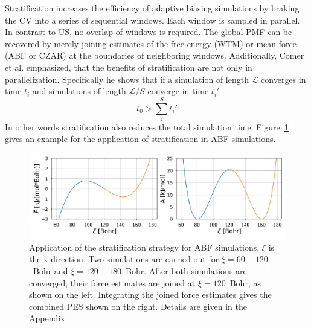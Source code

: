 Stratification increases the efficiency of adaptive biasing simulations by braking the CV into a series of sequential windows.\autocite{valleau1972monte} Each window is sampled in parallel.
In contrast to US, no overlap of windows is required.
The global PMF can be recovered by merely joining estimates of the free energy (WTM) or mean force (ABF or CZAR) at the boundaries of neighboring windows.
Additionally, Comer et al.\autocite{comer2015adaptive} emphasized, that the benefits of stratification are not only in parallelization.
Specifically he shows that if a simulation of length $\mathcal{L}$ converges in time $t_i$ and simulations of length $\mathcal{L}/S$ converge in time $t_i'$
\begin{equation}
  t_0 > \sum^S_i t_i'
\end{equation}
In other words stratification also reduces the total simulation time. Figure~\ref{fig:stratification} gives an example for the application of stratification in ABF simulations.
\begin{figure}[H]
    \centering
    \includegraphics[width=1\textwidth]{bilder/ABF_stratification}
    \caption{Application of the stratification strategy for ABF simulations. $\xi$ is the x-direction. Two simulations are carried out for $\xi=60-120$~Bohr and $\xi=120-180$~Bohr. After both simulations are converged, their force estimates are joined at $\xi=120$~Bohr, as shown on the left.
    Integrating the joined force estimates gives the combined PES shown on the right.
    Details are given in the Appendix.}
\label{fig:stratification}%
\end{figure}

